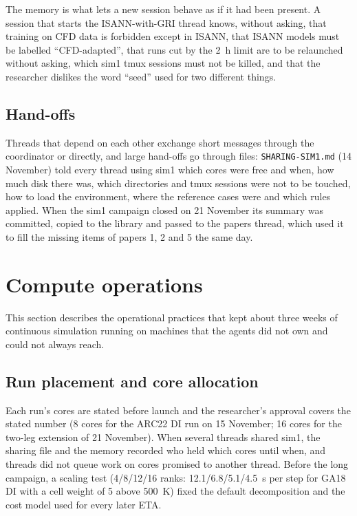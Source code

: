 \documentclass[preprint,review,12pt]{elsarticle}
\begin{document}
The memory is what lets a new session behave as if it had been present. A session that starts the ISANN-with-GRI thread
knows, without asking, that training on CFD data is forbidden except in ISANN, that ISANN models must be labelled
``CFD-adapted'', that runs cut by the 2~h limit are to be relaunched without asking, which sim1 tmux sessions must not be
killed, and that the researcher dislikes the word ``seed'' used for two different things.

\subsection{Hand-offs}
Threads that depend on each other exchange short messages through the coordinator or directly, and large hand-offs
go through files: \texttt{SHARING-SIM1.md} (14 November) told every thread using sim1 which cores were free and when,
how much disk there was, which directories and tmux sessions were not to be touched, how to load the environment, where
the reference cases were and which rules applied. When the sim1 campaign closed on 21 November its summary was committed,
copied to the library and passed to the papers thread, which used it to fill the missing items of papers 1, 2 and 5
the same day.

\section{Compute operations}\label{sec:ops}

This section describes the operational practices that kept about three weeks of continuous simulation running on
machines that the agents did not own and could not always reach.

\subsection{Run placement and core allocation}
Each run's cores are stated before launch and the researcher's approval covers the stated number (8 cores for the
ARC22 DI run on 15 November; 16 cores for the two-leg extension of 21 November). When several threads shared sim1, the
sharing file and the memory recorded who held which cores until when, and threads did not queue work on cores promised
to another thread. Before the long campaign, a scaling test (4/8/12/16 ranks: 12.1/6.8/5.1/4.5~s per step for GA18 DI
with a cell weight of 5 above 500~K) fixed the default decomposition and the cost model used for every later ETA.
\end{document}
